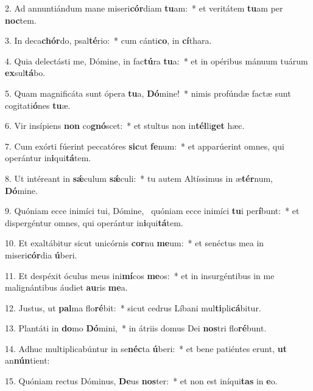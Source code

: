 2. Ad annuntiándum mane miseri\textbf{cór}diam \textbf{tu}am:~*  et veritátem \textbf{tu}am per \textbf{noc}tem.\

3. In deca\textbf{chór}do, psal\textbf{té}rio:~*  cum cánti\textbf{co}, in \textbf{cí}thara.\

4. Quia delectásti me, Dómine, in fac\textbf{tú}ra \textbf{tu}a:~*  et in opéribus mánuum tuárum \textbf{ex}sul\textbf{tá}bo.\

5. Quam magnificáta sunt ópera \textbf{tu}a, \textbf{Dó}mine!~*  nimis profúndæ factæ sunt cogitati\textbf{ó}nes \textbf{tu}æ.\

6. Vir insípiens \textbf{non} co\textbf{gnó}scet:~*  et stultus non in\textbf{tél}li\textbf{get} hæc.\

7. Cum exórti fúerint peccatóres \textbf{sic}ut \textbf{fe}num:~*  et apparúerint omnes, qui operántur in\textbf{i}qui\textbf{tá}tem.\

8. Ut intéreant in \textbf{sǽ}culum \textbf{sǽ}culi:~*  tu autem Altíssimus in æ\textbf{tér}num, \textbf{Dó}mine.\

9. Quóniam ecce inimíci tui, Dómine, \dag\  quóniam ecce inimíci \textbf{tu}i per\textbf{í}bunt:~*  et dispergéntur omnes, qui operántur in\textbf{i}qui\textbf{tá}tem.\

10. Et exaltábitur sicut unicórnis \textbf{cor}nu \textbf{me}um:~*  et senéctus mea in miseri\textbf{cór}dia \textbf{ú}beri.\

11. Et despéxit óculus meus ini\textbf{mí}cos \textbf{me}os:~*  et in insurgéntibus in me malignántibus áudiet \textbf{au}ris \textbf{me}a.\

12. Justus, ut \textbf{pal}ma flo\textbf{ré}bit:~*  sicut cedrus Líbani mul\textbf{ti}pli\textbf{cá}bitur.\

13. Plantáti in \textbf{do}mo \textbf{Dó}mini,~*  in átriis domus Dei \textbf{nos}tri flo\textbf{ré}bunt.\

14. Adhuc multiplicabúntur in se\textbf{néc}ta \textbf{ú}beri:~*  et bene patiéntes erunt, \textbf{ut} an\textbf{nún}tient:\

15. Quóniam rectus Dóminus, \textbf{De}us \textbf{nos}ter:~*  et non est iníqui\textbf{tas} in \textbf{e}o.\

